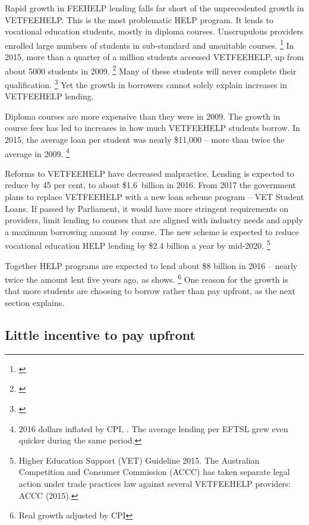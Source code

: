 \documentclass[embargoed]{grattan}
\begin{document}
Rapid growth in \gls{FEEHELP} lending falls far short of the unprecedented growth in \gls{VETFEEHELP}.
This is the most problematic \gls{HELP} program.
It lends to vocational education students, mostly in diploma courses.
Unscrupulous providers enrolled large numbers of students in sub-standard and unsuitable courses.%
\footnote{\textcite{Education2015Gettingourmoneys}} In 2015, more than a quarter of a million students accessed \gls{VETFEEHELP}, up from about 5000 students in 2009.%
\footnote{\textcite[][14]{Ryan2016RedesigningVETFEE}} Many of these students will never complete their qualification.%
\footnote{\textcite{NCVER2015preliminaryanalysisoutcomes}} Yet the growth in borrowers cannot solely explain increases in \gls{VETFEEHELP} lending.

Diploma courses are more expensive than they were in 2009.
The growth in course fees has led to increases in how much \gls{VETFEEHELP} students borrow.
In 2015, the average loan per student was nearly \$11,000 -- more than twice the average in 2009.%
\footnote{2016 dollars inflated by \gls{CPI}, \textcite[][17]{Ryan2016RedesigningVETFEE}.
The average lending per \gls{EFTSL} grew even quicker during the same period.}

Reforms to \gls{VETFEEHELP} have decreased malpractice.
Lending is expected to reduce by 45 per cent, to about \$1.6~billion in 2016.
From 2017 the government plans to replace \gls{VETFEEHELP} with a new loan scheme program -- VET Student Loans.
If passed by Parliament, it would have more stringent requirements on providers, limit lending to courses that are aligned with industry needs and apply a maximum borrowing amount by course.
The new scheme is expected to reduce vocational education \gls{HELP} lending by \$2.4 billion a year by mid-2020.%
\footnote{Higher Education Support (VET) Guideline 2015.
The Australian Competition and Consumer Commission (ACCC) has taken separate legal action under trade practices law against several \gls{VETFEEHELP} providers: \textcites{Birmingham2016MediareleaseNew}{ACCC2015ACCCtakesaction}ACCC (2015).}

Together \gls{HELP} programs are expected to lend about \$8 billion in 2016 -- nearly twice the amount lent five years ago, as  shows.%
\footnote{Real growth adjusted by \gls{CPI}} One reason for the growth is that more students are choosing to borrow rather than pay upfront, as the next section explains.

\subsection{Little incentive to pay upfront}\label{subsec:little-incentive-to-pay-upfront}
\end{document}
